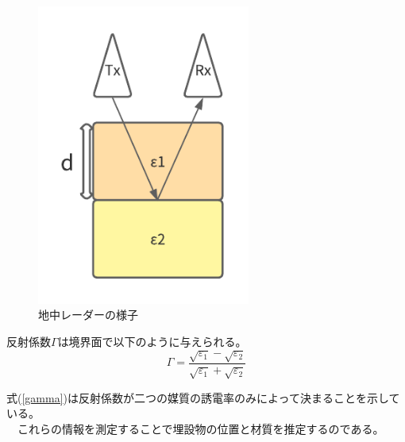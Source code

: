 \documentclass[a4paper,12pt]{jsreport}
\begin{document}
\begin{figure}[h]
  \begin{center}
   \includegraphics[width=7cm]{./image/radar.pdf}
   
  \caption{地中レーダーの様子}\label{地中レーダーの様子}
  \end{center}
  \end{figure}

反射係数$\Gamma$は境界面で以下のように与えられる。
\begin{equation}
  \Gamma=
  \frac{\sqrt{\varepsilon_{1}}-\sqrt{\varepsilon_{2}}}{\sqrt{\varepsilon_{1}}+\sqrt{\varepsilon_{2}}} 
\label{gamma}  
\end{equation}


式(\ref{gamma})は反射係数が二つの媒質の誘電率のみによって決まることを示している。
\\　これらの情報を測定することで埋設物の位置と材質を推定するのである。
\end{document}
